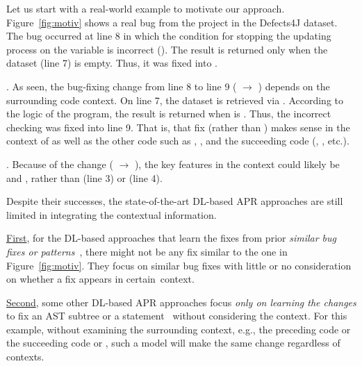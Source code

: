Let us start with a real-world example to motivate our approach.
Figure~\ref{fig:motiv} shows a real bug from the project 
in the Defects4J dataset. The bug occurred at line 8 in which the
condition for stopping the updating process on the 
variable is incorrect (). The result is
returned only when the dataset (line 7) is empty. Thus, it was fixed
into .

. As seen, the bug-fixing change from line 8 to
line 9 ( $\rightarrow$ ) depends on the surrounding code context. On line 7, the
dataset is retrieved via . According to the logic of
the program, the result is returned when  is
.  Thus, the incorrect checking was fixed into line 9. That
is, that fix (rather than ) makes sense in
the context of  as well as the other code such as
, , and the succeeding
code (, , etc.).

. Because of the change (
$\rightarrow$ ), the key features in the
context could likely be  and ,
rather than  (line 3) or 
(line 4).

Despite their successes, the state-of-the-art DL-based APR approaches
are still limited in integrating the contextual information.

\underline{First}, for the DL-based approaches that learn the fixes
from prior {\em similar bug fixes or
  patterns}~\cite{gupta2017deepfix,white2019sorting,white2016deep},
there might not be any fix similar to the one in
Figure~\ref{fig:motiv}. They focus on similar bug fixes with little or
no consideration on whether a fix appears in certain~context.

\underline{Second}, some other DL-based APR approaches focus {\em only
  on learning the changes} to fix an AST subtree or a
statement~\cite{chakrabortycodit,see2017get} without considering the
context. For this example, without examining the surrounding context,
e.g., the preceding code  or the succeeding code
 or , such a model will
make the same change regardless of contexts.

